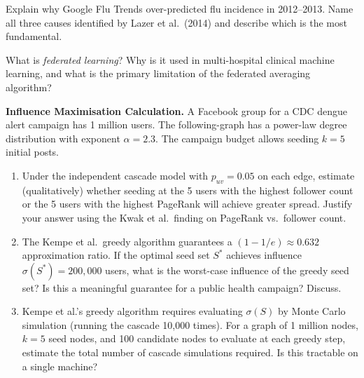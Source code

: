 \sq Explain why Google Flu Trends over-predicted flu incidence in 2012--2013.
Name all three causes identified by Lazer et al.\ (2014) and describe which
is the most fundamental.

\sq What is \emph{federated learning}? Why is it used in multi-hospital
clinical machine learning, and what is the primary limitation of the
federated averaging algorithm?


\ap \textbf{Influence Maximisation Calculation.}
A Facebook group for a CDC dengue alert campaign has 1 million users.
The following-graph has a power-law degree distribution with exponent
$\alpha = 2.3$. The campaign budget allows seeding $k = 5$ initial posts.

\begin{enumerate}[label=(\alph*)]
  \item Under the independent cascade model with $p_{uv} = 0.05$ on each
        edge, estimate (qualitatively) whether seeding at the 5 users with
        the highest follower count or the 5 users with the highest PageRank
        will achieve greater spread. Justify your answer using the Kwak
        et al.\ finding on PageRank vs.\ follower count.
  \item The Kempe et al.\ greedy algorithm guarantees a $(1-1/e) \approx 0.632$
        approximation ratio. If the optimal seed set $S^*$ achieves influence
        $\sigma(S^*) = 200{,}000$ users, what is the worst-case influence
        of the greedy seed set? Is this a meaningful guarantee for a
        public health campaign? Discuss.
  \item Kempe et al.'s greedy algorithm requires evaluating $\sigma(S)$
        by Monte Carlo simulation (running the cascade 10{,}000 times).
        For a graph of 1 million nodes, $k = 5$ seed nodes, and 100
        candidate nodes to evaluate at each greedy step, estimate the
        total number of cascade simulations required. Is this tractable
        on a single machine?
\end{enumerate}

